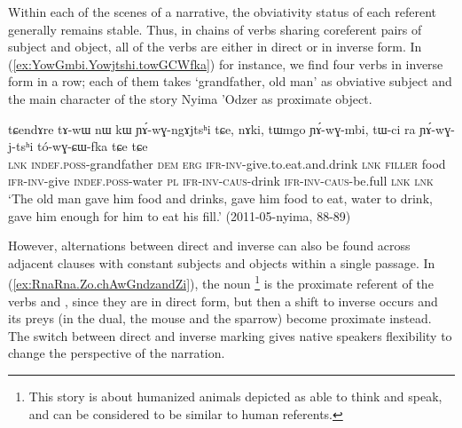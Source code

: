Within each of the scenes of a narrative, the obviativity status of each referent generally remains stable. Thus, in chains of verbs sharing coreferent pairs of subject and object, all of the verbs are either in direct or in inverse form. In (\ref{ex:YowGmbi.Yowjtshi.towGCWfka}) for instance, we find four verbs in inverse form in a row; each of them takes  `grandfather, old man' as obviative subject and the main character of the story Nyima 'Odzer as proximate object.

\begin{exe}
\ex \label{ex:YowGmbi.Yowjtshi.towGCWfka}
\gll tɕendɤre tɤ-wɯ nɯ kɯ ɲɤ́-wɣ-ngɤjtsʰi tɕe, nɤki, tɯmgo ɲɤ́-wɣ-mbi, tɯ-ci ra ɲɤ́-wɣ-j-tsʰi tó-wɣ-ɕɯ-fka tɕe tɕe \\
\textsc{lnk} \textsc{indef}.\textsc{poss}-grandfather \textsc{dem} \textsc{erg} \textsc{ifr}-\textsc{inv}-give.to.eat.and.drink \textsc{lnk} \textsc{filler} food \textsc{ifr}-\textsc{inv}-give \textsc{indef}.\textsc{poss}-water \textsc{pl} \textsc{ifr}-\textsc{inv}-\textsc{caus}-drink \textsc{ifr}-\textsc{inv}-\textsc{caus}-be.full \textsc{lnk} \textsc{lnk} \\
\glt `The old man gave him food and drinks, gave him food to eat, water to drink, gave him enough for him to eat his fill.' (2011-05-nyima, 88-89)
\end{exe}


However, alternations between direct and inverse can also be found across adjacent clauses with constant subjects and objects within a single passage. In (\ref{ex:RnaRna.Zo.chAwGndzandZi}), the noun \footnote{This story is about humanized animals depicted as able to think and speak, and can be considered to be similar to human referents. } is the  proximate referent of the verbs  and , since they are in direct form, but then a shift to inverse occurs and its preys (in the dual, the mouse and the sparrow) become proximate instead. The switch between direct and inverse marking gives native speakers flexibility to change the perspective of the narration.

